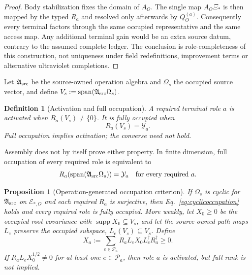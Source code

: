 \documentclass[11pt]{article}
\newtheorem{definition}{Definition}
\newtheorem{proposition}{Proposition}
\begin{document}
\begin{proof}
Body stabilization fixes the domain of $A_O$.  The single map $A_O\Xi_*$ is
then mapped by the typed $R_a$ and resolved only afterwards by
$Q_O^{(a)}$.  Consequently every terminal factors through the same occupied
representative and the same access map.  Any additional terminal gain would
be an extra source datum, contrary to the assumed complete ledger.  The
conclusion is role-completeness of this construction, not uniqueness under
field redefinitions, improvement terms or alternative ultraviolet
completions.
\end{proof}

Let $\mathfrak A_{\rm src}$ be the source-owned operation algebra and
$\Omega_s$ the occupied source vector, and define
$V_s:=\operatorname{span}(\mathfrak A_{\rm src}\Omega_s)$.

\begin{definition}[Activation and full occupation]
A required terminal role $a$ is \emph{activated} when $R_a(V_s)\neq\{0\}$.
It is \emph{fully occupied} when
\begin{equation}
R_a(V_s)=\mathcal Y_a.
\label{eq:fulloccupation}
\end{equation}
Full occupation implies activation; the converse need not hold.
\end{definition}

Assembly does not by itself prove either property.  In finite dimension, full
occupation of every required role is equivalent to
\begin{equation}
R_a\!\left(\operatorname{span}(\mathfrak A_{\rm src}\Omega_s)\right)=\mathcal Y_a
\quad\text{for every required }a.
\label{eq:cyclicoccupation}
\end{equation}

\begin{proposition}[Operation-generated occupation criterion]
\label{prop:occupation}
If $\Omega_s$ is cyclic for $\mathfrak A_{\rm src}$ on
$\mathcal E_{*,O}$ and each required $R_a$ is surjective, then
Eq.~\eqref{eq:cyclicoccupation} holds and every required role is fully
occupied.  More weakly, let $X_0\geq0$ be the occupied root covariance with
$\operatorname{supp}X_0\subseteq V_s$, and let the source-owned path maps
$L_e$ preserve the occupied subspace, $L_e(V_s)\subseteq V_s$.  Define
\begin{equation}
X_a:=\sum_{e\in\mathcal P_a}R_aL_eX_0L_e^\dagger R_a^\dagger\geq0.
\label{eq:positivepaths}
\end{equation}
If $R_aL_eX_0^{1/2}\neq0$ for at least one $e\in\mathcal P_a$, then role $a$
is activated, but full rank is not implied.
\end{proposition}
\end{document}
